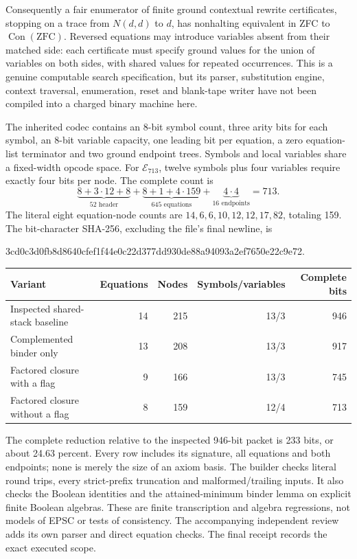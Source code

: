 Consequently a fair enumerator of finite ground contextual rewrite
certificates, stopping on a trace from $N(d,d)$ to $d$, has nonhalting
equivalent in ZFC to $\operatorname{Con}(\mathrm{ZFC})$. Reversed equations
may introduce variables absent from their matched side: each certificate
must specify ground values for the union of variables on both sides,
with shared values for repeated occurrences. This is a genuine
computable search specification, but its parser, substitution engine,
context traversal, enumeration, reset and blank-tape writer have not
been compiled into a charged binary machine here.

The inherited codec contains an 8-bit symbol count, three arity bits for
each symbol, an 8-bit variable capacity, one leading bit per equation,
a zero equation-list terminator and two ground endpoint trees. Symbols
and local variables share a fixed-width opcode space. For $\mathcal E_{713}$,
twelve symbols plus four variables require exactly four bits per node.
The complete count is
\[
 \underbrace{8+3\cdot12+8}_{52\text{ header}}
 +\underbrace{8+1+4\cdot159}_{645\text{ equations}}
 +\underbrace{4\cdot4}_{16\text{ endpoints}}=713.
\]
The literal eight equation-node counts are
$14,6,6,10,12,12,17,82$, totaling 159.
The bit-character SHA-256, excluding the file's final newline, is
\begin{center}\small\ttfamily
3cd0c3d0fb8d8640cfef1f44e0c22d377dd930de88a94093a2ef7650e22c9e72.
\end{center}

\begin{center}
\begin{tabular}{lrrrr}
\hline
Variant&Equations&Nodes&Symbols/variables&Complete bits\\\hline
Inspected shared-stack baseline&14&215&13/3&946\\
Complemented binder only&13&208&13/3&917\\
Factored closure with a flag&9&166&13/3&745\\
Factored closure without a flag&8&159&12/4&713\\\hline
\end{tabular}
\end{center}

The complete reduction relative to the inspected 946-bit packet is 233
bits, or about 24.63 percent. Every row includes its signature, all
equations and both endpoints; none is merely the size of an axiom basis.
The builder checks literal round trips, every strict-prefix truncation
and malformed/trailing inputs. It also checks the Boolean identities and
the attained-minimum binder lemma on explicit finite Boolean algebras.
These are finite transcription and algebra regressions, not models of
EPSC or tests of consistency. The accompanying independent review adds
its own parser and direct equation checks. The final receipt records the
exact executed scope.

